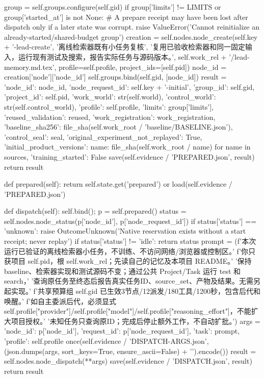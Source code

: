         group = self.groups.configure(self.gid)
        if group['limits'] != LIMITS or group['started_at'] is not None:
            # A prepare receipt may have been lost after dispatch only if a later state was corrupt.
            raise ValueError('Cannot reinitialize an already-started/shared-budget group')
        creation = self.nodes.node_create(self.key + '-lead-create', '离线检索器既有小任务复核',
            '复用已验收检索器和同一固定输入，运行现有测试及搜索，报告实际任务与源码版本。',
            self.work_rel + '/lead-memory.md.tex', profile=self.profile, project_ids=[self.pid])
        node_id = creation['node']['node_id']
        self.groups.bind(self.gid, [node_id])
        result = {'node_id': node_id, 'node_request_id': self.key + '-initial', 'group_id': self.gid,
                  'project_id': self.pid, 'work_world': str(self.world), 'control_world': str(self.control_world),
                  'profile': self.profile, 'limits': group['limits'], 'reused_validation': reused,
                  'work_registration': work_registration, 'baseline_sha256': file_sha(self.work_root / 'baseline/BASELINE.json'),
                  'control_seal': seal, 'original_experiment_not_replayed': True,
                  'initial_product_versions': {name: file_sha(self.work_root / name) for name in sources},
                  'training_started': False}
        save(self.evidence / 'PREPARED.json', result)
        return result

    def prepared(self):
        return self.state.get('prepared') or load(self.evidence / 'PREPARED.json')

    def dispatch(self):
        self.bind(); p = self.prepared()
        status = self.nodes.node_status(p['node_id'], p['node_request_id'])
        if status['status'] == 'unknown':
            raise OutcomeUnknown('Native reservation exists without a start receipt; never replay')
        if status['status'] != 'idle':
            return status
        prompt = (f'本次运行已验证的离线检索器小任务，不训练、不访问网络/浏览器或控制区。'
                  f'你只获项目 {self.pid}，根 {self.work_rel}；先读自己的记忆及本项目 README。'
                  '保持 baseline、检索器实现和测试源码不变；通过公共 Project/Task 运行 test 和 search，'
                  '查询原任务至终态后报告真实任务ID、source_set、产物及结果。无需另起实现。'
                  f'共享预算组 {self.gid} 已生效3节点/12派发/180工具/1200秒，包含后代和唤醒。'
                  f'如自主委派后代，必须显式 {self.profile["provider"]}/{self.profile["model"]}/{self.profile["reasoning_effort"]}，不能扩大项目授权。'
                  '未知任务只查询原ID；完成后停止额外工作，不自动扩批。')
        args = {'node_id': p['node_id'], 'request_id': p['node_request_id'], 'task': prompt, 'profile': self.profile}
        once(self.evidence / 'DISPATCH-ARGS.json', (json.dumps(args, sort_keys=True, ensure_ascii=False) + '\n').encode())
        result = self.nodes.node_dispatch(**args)
        save(self.evidence / 'DISPATCH.json', result)
        return result

